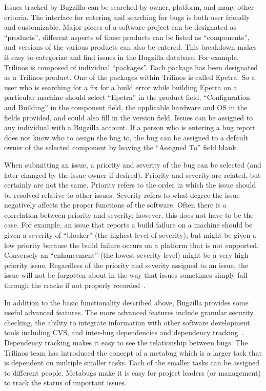 \documentclass[12pt,relax]{article}
\begin{document}
Issues tracked by Bugzilla can be searched by owner, platform, and many other 
criteria.  The 
interface for entering and searching for bugs is both user friendly and 
customizable.  Major pieces of a software project can be 
designated as ``products'', different aspects of those products can be 
listed as ``components'', and versions of the various products can also be 
entered.  This breakdown makes it easy to categorize and find issues in the 
Bugzilla database.  For example, Trilinos is composed of individual 
``packages''.  Each package has been designated as a Trilinos product.  One of 
the packages within Trilinos is called Epetra.  So a user who is searching for 
a fix for a build error while building Epetra on a particular 
machine should select ``Epetra'' in the product field, ``Configuration and 
Building'' in the component field, the applicable hardware and OS in the 
fields provided, and
could also fill in the version field.  Issues can be assigned to any 
individual with a Bugzilla account.  If a 
person who is entering a bug report does not know who to assign the bug to,
the bug can be assigned to a default owner of the selected component 
by leaving the ``Assigned To'' field blank.  

When submitting an issue, a 
priority and severity of the bug can be selected (and later changed by the 
issue owner if desired).  Priority and severity are related, but certainly are 
not the same.  Priority refers to the order in which the issue should be 
resolved relative to other issues.  Severity refers to what degree the issue 
negatively affects the proper functions of the software.  Often there is a 
correlation between priority and severity; however, this does not have to be
the case.  For example, an issue that reports a build failure on a 
machine should be given a severity of ``blocker'' (the highest level of 
severity), but might be given a low priority because the build failure occurs
on a platform that is not supported.  Conversely an ``enhancement'' (the 
lowest severity level) might be a very high priority issue.  Regardless of the 
priority and severity assigned to an issue, the issue will not be forgotten 
about in the way that issues sometimes simply fall through the cracks if not 
properly recorded~\cite{Bugzilla}.

In addition to the basic functionality described above, Bugzilla provides some 
useful advanced features.  The more advanced features include
granular security checking, the ability to integrate information with 
other software development tools including CVS, and inter-bug 
dependencies and dependency tracking~\cite{Bugzilla}.  Dependency tracking 
makes it easy to see the relationship 
between bugs.  The Trilinos team has introduced the concept of a metabug which 
is a larger task that is dependent on multiple smaller tasks.  Each of the 
smaller tasks can be assigned to different people. Metabugs make it is easy 
for project leaders (or management) to track the status of important issues. 
\end{document}
